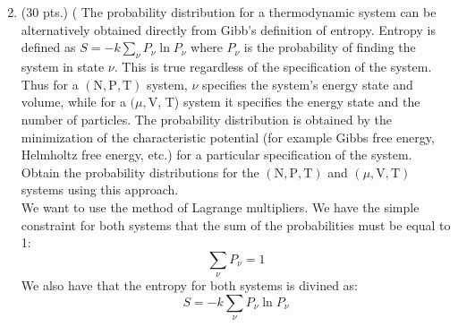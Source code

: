 \documentclass[10pt]{article}
\begin{document}
\section{}
\begin{enumerate}
  \setcounter{enumi}{1}
  \item (30 pts.) ( The probability distribution for a thermodynamic system can be alternatively obtained directly from Gibb's definition of entropy. Entropy is defined as $S=-k \sum_{\nu} P_{\nu} \ln P_{\nu}$ where $P_{\nu}$ is the probability of finding the system in state $\nu$. This is true regardless of the specification of the system. Thus for a $(\mathrm{N}, \mathrm{P}, \mathrm{T})$ system, $\nu$ specifies the system's energy state and volume, while for a $(\mu, \mathrm{V}$, T) system it specifies the energy state and the number of particles. The probability distribution is obtained by the minimization of the characteristic potential (for example Gibbs free energy, Helmholtz free energy, etc.) for a particular specification of the system. Obtain the probability distributions for the $(\mathrm{N}, \mathrm{P}, \mathrm{T})$ and $(\mu, \mathrm{V}, \mathrm{T})$ systems using this approach.
\\
We want to use the method of Lagrange multipliers. We have the simple constraint for both systems that the sum of the probabilities must be equal to 1:
\begin{equation}
  \sum_{\nu} P_{\nu} = 1
\end{equation}
We also have that the entropy for both systems is divined as:
\begin{equation}
  S = - k \sum_{\nu} P_{\nu} \ln P_{\nu}
\end{equation}

\end{enumerate}
\end{document}
